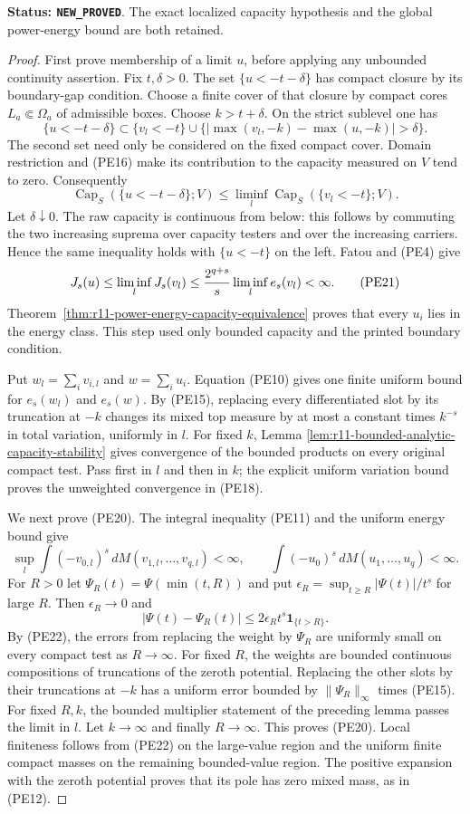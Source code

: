 \documentclass[11pt,a4paper]{article}
\numberwithin{equation}{section}
\theoremstyle{definition}
\theoremstyle{remark}
\begin{document}
\noindent\textbf{Status: \texttt{NEW\_PROVED}}. The exact
localized capacity hypothesis and the global power-energy bound
are both retained.

\begin{proof}
First prove membership of a limit $u$, before applying any
unbounded continuity assertion. Fix $t,\delta>0$. The set
$\{u<-t-\delta\}$ has compact closure by its boundary-gap
condition. Choose a finite cover of that closure by compact
cores $L_a\Subset\Omega_a$ of admissible boxes. Choose
$k>t+\delta$. On the strict sublevel one has
\[
 \{u<-t-\delta\}
 \subset\{v_l<-t\}\cup
       \{|\max(v_l,-k)-\max(u,-k)|>\delta\}.
\]
The second set need only be considered on the fixed compact
cover. Domain restriction and (PE16) make its contribution to
the capacity measured on $V$ tend to zero. Consequently
\[
 \operatorname{Cap}_S(\{u<-t-\delta\};V)
       \leq\liminf_l\operatorname{Cap}_S(\{v_l<-t\};V).
\]
Let $\delta\downarrow0$. The raw capacity is continuous from
below: this follows by commuting the two increasing suprema
over capacity testers and over the increasing carriers. Hence
the same inequality holds with $\{u<-t\}$ on the left.
Fatou and (PE4) give
\[
 J_s(u)\leq\liminf_lJ_s(v_l)
       \leq {2^{q+s}\over s}\liminf_l e_s(v_l)<\infty.
 \tag{PE21}
\]
Theorem~\ref{thm:r11-power-energy-capacity-equivalence} proves
that every $u_i$ lies in the energy class. This step used only
bounded capacity and the printed boundary condition.

Put $w_l=\sum_i v_{i,l}$ and $w=\sum_i u_i$.
Equation (PE10) gives one finite uniform bound for $e_s(w_l)$
and $e_s(w)$. By (PE15), replacing every differentiated slot
by its truncation at $-k$ changes its mixed top measure by at
most a constant times $k^{-s}$ in total variation, uniformly
in $l$. For fixed $k$, Lemma
\ref{lem:r11-bounded-analytic-capacity-stability} gives convergence
of the bounded products on every original compact test.
Pass first in $l$ and then in $k$; the explicit uniform
variation bound proves the unweighted convergence in (PE18).

We next prove (PE20). The integral inequality (PE11) and the
uniform energy bound give
\[
 \sup_l\int(-v_{0,l})^s\,dM(v_{1,l},\ldots,v_{q,l})<\infty,
 \qquad
 \int(-u_0)^s\,dM(u_1,\ldots,u_q)<\infty.
 \tag{PE22}
\]
For $R>0$ let $\Psi_R(t)=\Psi(\min(t,R))$ and put
$\epsilon_R=\sup_{t\geq R}|\Psi(t)|/t^s$ for large $R$.
Then $\epsilon_R\to0$ and
\[
          |\Psi(t)-\Psi_R(t)|
                \leq2\epsilon_R t^s\mathbf1_{\{t>R\}}.
\]
By (PE22), the errors from replacing the weight by $\Psi_R$
are uniformly small on every compact test as $R\to\infty$.
For fixed $R$, the weights are bounded continuous compositions
of truncations of the zeroth potential. Replacing the other
slots by their truncations at $-k$ has a uniform error bounded
by $\|\Psi_R\|_\infty$ times (PE15). For fixed $R,k$, the
bounded multiplier statement of the preceding lemma passes
the limit in $l$. Let $k\to\infty$ and finally $R\to\infty$.
This proves (PE20). Local finiteness follows from (PE22) on
the large-value region and the uniform finite compact masses
on the remaining bounded-value region. The positive expansion
with the zeroth potential proves that its pole has zero mixed
mass, as in (PE12).


\end{proof}
\end{document}
